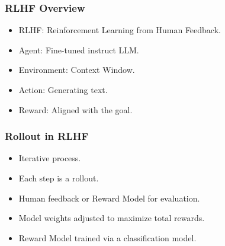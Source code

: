 \begin{frame}[fragile]\frametitle{RLHF Overview}
\begin{itemize}
    \item RLHF: Reinforcement Learning from Human Feedback.
    \item Agent: Fine-tuned instruct LLM.
    \item Environment: Context Window.
    \item Action: Generating text.
    \item Reward: Aligned with the goal.
\end{itemize}
\end{frame}

\begin{frame}[fragile]\frametitle{Rollout in RLHF}
\begin{itemize}
    \item Iterative process.
    \item Each step is a rollout.
    \item Human feedback or Reward Model for evaluation.
    \item Model weights adjusted to maximize total rewards.
    \item Reward Model trained via a classification model.
\end{itemize}
\end{frame}



